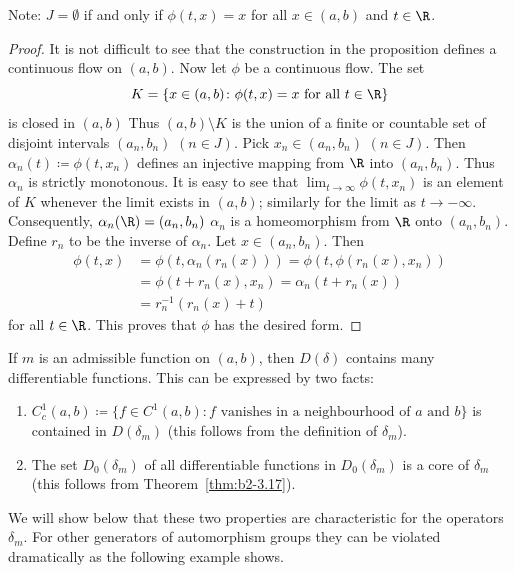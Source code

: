 Note: $J = \emptyset$ if and only if\/ $\phi(t,x) = x$ for all $x \in (a,b)$ and $t \in \R$.
\begin{proof}
It is not difficult to see that the construction in the proposition defines a continuous flow on $(a,b)$.
Now let $\phi$ be a continuous flow.
The set 
\[
K = \{ x \in (a,b) \colon \phi(t,x) = x \text{ for all } t \in \R \} 
\]
is closed in $(a,b)$
Thus $(a,b) \setminus K$ is the union of a finite or countable set of disjoint intervals $(a_{n},b_{n})$ $(n \in J)$.
Pick $x_{n} \in (a_{n},b_{n})$ $(n \in J)$.
Then $\alpha_{n}(t) \coloneqq \phi(t,x_{n})$ defines an injective mapping from $\R$ into $(a_{n},b_{n})$.
Thus $\alpha_{n}$ is strictly monotonous.
It is easy to see that $\lim_{t \to \infty} \phi(t,x_{n})$ is an element of\/ $K$ whenever the limit exists in $(a,b)$; similarly for the limit as $t \to -\infty$.
Consequently, $\alpha_{n}(\R) = (a_{n},b_{n})$ \ie  $\alpha_{n}$ is a homeomorphism from $\R$ onto $(a_{n},b_{n})$.
Define $r_{n}$ to be the inverse of\/ $\alpha_{n}$.
Let $x \in (a_{n},b_{n})$.
Then 
\begin{align*}
\phi(t,x) &= \phi(t, \alpha_{n}(r_{n}(x))) = \phi(t, \phi(r_{n}(x),x_{n})) \\
          &= \phi(t + r_{n}(x),x_{n}) = \alpha_{n}(t + r_{n}(x)) \\
          &= r_{n}^{-1}(r_{n}(x) + t)	
\end{align*}
for all $t \in \R$.
This proves that $\phi$ has the desired form.
\end{proof}
If\/ $m$ is an admissible function on $(a,b)$, then $D(\delta)$ contains many differentiable functions.
This can be expressed by two facts:
\begin{enumerate}[\upshape (i)]
\item \label{enum:b2-3-1.1}
$C_{c}^{1}(a,b) \coloneqq \{ f \in C^{1}(a,b) \colon f \text{ vanishes in a neighbourhood of } a \text{ and } b\}$ is contained in $D(\delta_{m})$ (this follows from the definition of\/ $\delta_{m}$).

\item  \label{enum:b2-3-1.2}
The set $D_{0}(\delta_{m})$ of all differentiable functions in $D_{0}(\delta_{m})$ is a core of\/ $\delta_{m}$ (this follows from Theorem~\ref{thm:b2-3.17}).
\end{enumerate}
We will show below that these two properties are characteristic for the operators $\delta_{m}$.
For other generators of automorphism groups they can be violated dramatically as the following example shows.
